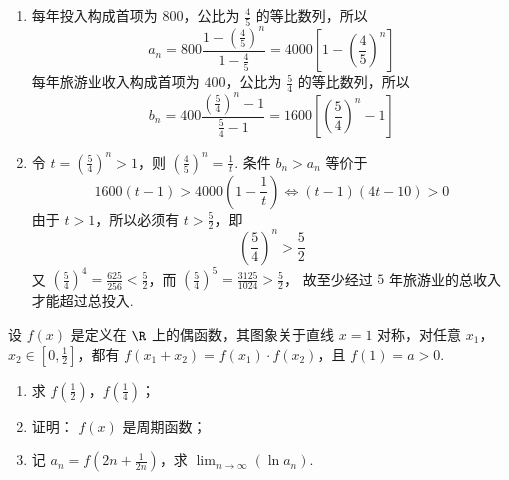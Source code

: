 \begin{solution}
\begin{enumerate}
\item 每年投入构成首项为 \(800\)，公比为 \(\frac45\) 的等比数列，所以
\[
a_n=800\frac{1-\left(\frac45\right)^n}{1-\frac45}=4000\left[1-\left(\frac45\right)^n\right]
\]
每年旅游业收入构成首项为 \(400\)，公比为 \(\frac54\) 的等比数列，所以
\[
b_n=400\frac{\left(\frac54\right)^n-1}{\frac54-1}=1600\left[\left(\frac54\right)^n-1\right]
\]
\item 令 \(t=\left(\frac54\right)^n>1\)，则 \(\left(\frac45\right)^n=\frac1t\). 条件 \(b_n>a_n\) 等价于
\[
1600(t-1)>4000\left(1-\frac1t\right)
\Longleftrightarrow (t-1)(4t-10)>0
\]
由于 \(t>1\)，所以必须有 \(t>\frac52\)，即
\[
\left(\frac54\right)^n>\frac52
\]
又 \(\left(\frac54\right)^4=\frac{625}{256}<\frac52\)，而
\(\left(\frac54\right)^5=\frac{3125}{1024}>\frac52\)，
故至少经过 \(5\) 年旅游业的总收入才能超过总投入.
\end{enumerate}
\end{solution}

\begin{problem}
设 \( f(x) \) 是定义在 \( \R \) 上的偶函数，其图象关于直线 \( x = 1 \) 对称，对任意 \( x_{1} \)，\( x_{2} \in \left[0, \frac{1}{2}\right] \)，都有 \( f(x_{1} + x_{2}) = f(x_{1}) \cdot f(x_{2}) \)，且 \( f(1) = a > 0 \).

\begin{enumerate}
\item 求 \(f\left(\frac{1}{2}\right)\)，\(f\left(\frac{1}{4}\right)\)；
\item 证明： \( f(x) \) 是周期函数；
\item 记 \(a_{n} = f\left(2n + \frac{1}{2n}\right)\)，求 \(\displaystyle\lim_{n \to \infty}(\ln a_{n})\).
\end{enumerate}
\end{problem}

